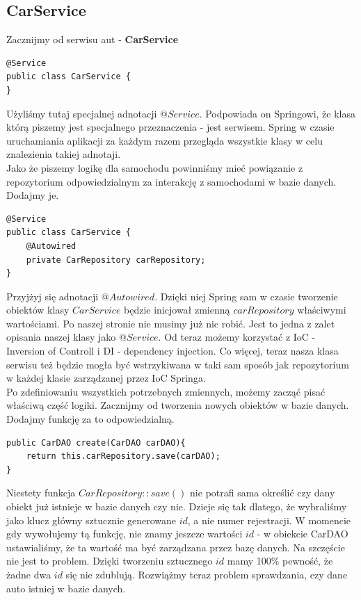 \documentclass{article}
\begin{document}
        \subsection{CarService}
        Zacznijmy od serwisu aut - \textbf{CarService}
        \begin{verbatim}
@Service
public class CarService {
}
        \end{verbatim}
        Użyliśmy tutaj specjalnej adnotacji $@Service$. Podpowiada on Springowi, że klasa którą piszemy jest specjalnego przeznaczenia - jest serwisem. Spring w czasie uruchamiania aplikacji za każdym razem przegląda wszystkie klasy w celu znalezienia takiej adnotaji. \\
        Jako że piszemy logikę dla samochodu powinniśmy mieć powiązanie z repozytorium odpowiedzialnym za interakcję z samochodami w bazie danych. Dodajmy je.
        \begin{verbatim}
@Service
public class CarService {
    @Autowired
    private CarRepository carRepository;  
}

        \end{verbatim}
        Przyjżyj się adnotacji $@Autowired$. Dzięki niej Spring sam w czasie tworzenie obiektów klasy $CarService$ będzie inicjował zmienną $carRepository$ właściwymi wartościami. Po naszej stronie nie musimy już nic robić. Jest to jedna z zalet opisania naszej klasy jako $@Service$. Od teraz możemy korzystać z IoC - Inversion of Controll i DI - dependency injection. Co więcej, teraz nasza klasa serwisu też będzie mogła być wstrzykiwana w taki sam sposób jak repozytorium w każdej klasie zarządzanej przez IoC Springa. \\
        Po zdefiniowaniu wszystkich potrzebnych zmiennych, możemy zacząć pisać właściwą część logiki. Zacznijmy od tworzenia nowych obiektów w bazie danych. Dodajmy funkcję za to odpowiedzialną.
        \begin{verbatim}
public CarDAO create(CarDAO carDAO){
    return this.carRepository.save(carDAO);
}
        \end{verbatim}
        Niestety funkcja $CarRepository::save()$ nie potrafi sama określić czy dany obiekt już istnieje w bazie danych czy nie. Dzieje się tak dlatego, że wybraliśmy jako klucz główny sztucznie generowane $id$, a nie numer rejestracji. W momencie gdy wywołujemy tą funkcję, nie znamy jeszcze wartości $id$ - w obiekcie CarDAO ustawialiśmy, że ta wartość ma być zarządzana przez bazę danych. Na szczęście nie jest to problem. Dzięki tworzeniu sztucznego $id$ mamy 100\% pewność, że żadne dwa $id$ się nie zdublują. Rozwiążmy teraz problem sprawdzania, czy dane auto istniej w bazie danych.
\end{document}
